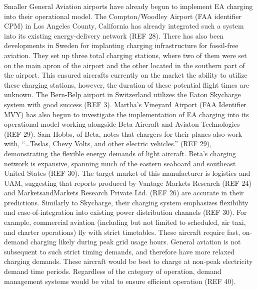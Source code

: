\documentclass{article}
\begin{document}
Smaller General Aviation airports have already begun to implement EA charging into their operational model. The Compton/Woodley Airport (FAA identifier CPM) in Los Angeles County, California has already integrated such a system into its existing energy-delivery network (REF 28). There has also been developments in Sweden for implanting charging infrastructure for fossil-free aviation. They set up three total charging stations, where two of them were set on the main apron of the airport and the other located in the southern part of the airport. This ensured aircrafts currently on the market the ability to utilize these charging stations, however, the duration of these potential flight times are unknown. The Bern-Belp airport in Switzerland utilizes the Eaton Skycharge system with good success (REF 3). Martha’s Vineyard Airport (FAA Identifier MVY) has also begun to investigate the implementation of EA charging into its operational model working alongside Beta Aircraft and Aviaton Technologies (REF 29). Sam Hobbs, of Beta, notes that chargers for their planes also work with, “…Teslas, Chevy Volts, and other electric vehicles.” (REF 29), demonstrating the flexible energy demands of light aircraft. Beta’s charging network is expansive, spanning much of the eastern seaboard and southeast United States (REF 30). The target market of this manufacturer is logistics and UAM, suggesting that reports produced by Vantage Markets Research (REF 24) and MarketsandMarkets Research Private Ltd. (REF 26) are accurate in their predictions. Similarly to Skycharge, their charging system emphasizes flexibility and ease-of-integration into existing power distribution channels (REF 30). For example, commercial aviation (including but not limited to scheduled, air taxi, and charter operations) fly with strict timetables. These aircraft require fast, on-demand charging likely during peak grid usage hours. General aviation is not subsequent to such strict timing demands, and therefore have more relaxed charging demands. These aircraft would be best to charge at non-peak electricity demand time periods. Regardless of the category of operation, demand management systems would be vital to ensure efficient operation (REF 40).\par
\end{document}
